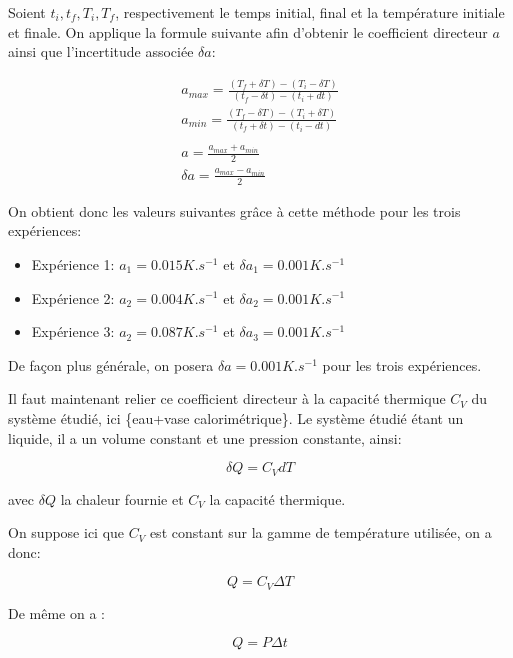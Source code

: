 \documentclass[12pt]{article}
\begin{document}
Soient $t_i, t_f, T_i, T_f$, respectivement le temps initial, final et la température initiale et finale. On applique la formule suivante afin d'obtenir le coefficient directeur $a$ ainsi que l'incertitude associée $\delta a$:

\begin{gather*}
	a_{max} = \frac{(T_f + \delta T) - (T_i - \delta T)}{(t_f - \delta t) - (t_i + dt)} \\
	a_{min} = \frac{(T_f - \delta T) - (T_i + \delta T)}{(t_f + \delta t) - (t_i - dt)} \\
	\\
	a = \frac{a_{max} + a_{min}}{2} \\
	\delta a = \frac{a_{max} - a_{min}}{2}
\end{gather*}

On obtient donc les valeurs suivantes grâce à cette méthode pour les trois expériences:
\begin{itemize}
	\item Expérience 1: $a_1 = 0.015 K.s^{-1}$ et $\delta a_1 = 0.001 K.s^{-1}$
	\item Expérience 2: $a_2 = 0.004 K.s^{-1}$ et $\delta a_2 = 0.001 K.s^{-1}$
	\item Expérience 3: $a_2 = 0.087 K.s^{-1}$ et $\delta a_3 = 0.001 K.s^{-1}$
\end{itemize}

De façon plus générale, on posera $\delta a = 0.001 K.s^{-1}$ pour les trois expériences.

\newpage
Il faut maintenant relier ce coefficient directeur à la capacité thermique $C_V$ du système étudié, ici \{eau+vase calorimétrique\}.
Le système étudié étant un liquide, il a un volume constant et une pression constante, ainsi:

\begin{equation}
\delta Q=C_VdT
\end{equation}

avec $\delta Q$ la chaleur fournie et $C_V$ la capacité thermique. 

On suppose ici que $C_V$ est constant sur la gamme de température utilisée, on a donc:

\begin{equation}
Q=C_V\Delta T
\end{equation}

De même on a :

\begin{equation}
Q=P\Delta t
\end{equation}
\end{document}

